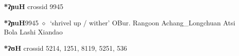 \item
\textbf{*ʔɲuH}
  {\tiny crossid 9945}
  \begin{list}{}{\leftmargin=1.5em \itemindent=-1.5em}
  \item {\footnotesize \textbf{*ʔɲuH}}{\tiny 9945}
         $\diamond$~`shrivel up / wither'
         OBur. 
\hspace{1ex}
         Rangoon 
\hspace{1ex}
         Achang\_Longchuan 
\hspace{1ex}
         Atsi 
\hspace{1ex}
         Bola 
\hspace{1ex}
         Lashi 
\hspace{1ex}
         Xiandao 
  \end{list}
\item
\textbf{*ʔʊH}
  {\tiny crossid 5214, 1251, 8119, 5251, 536}
